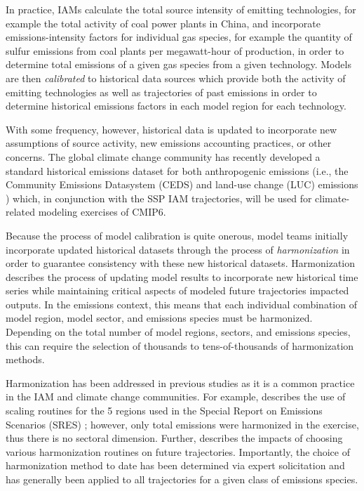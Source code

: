 In practice, IAMs calculate the total source intensity of emitting technologies,
for example the total activity of coal power plants in China, and incorporate
emissions-intensity factors for individual gas species, for example the quantity
of sulfur emissions from coal plants per megawatt-hour of production, in order
to determine total emissions of a given gas species from a given
technology. Models are then \textit{calibrated} to historical data sources which
provide both the activity of emitting technologies as well as trajectories of
past emissions in order to determine historical emissions factors in each model
region for each technology.

With some frequency, however, historical data is updated to incorporate new
assumptions of source activity, new emissions accounting practices, or other
concerns. The global climate change community has recently developed a standard
historical emissions dataset for both anthropogenic emissions (i.e., the
Community Emissions Datasystem (CEDS) \cite{hoesly_historical_2017} and
land-use change (LUC) emissions \cite{van_marle_historic_2017}) which, in
% 
% 
conjunction with the SSP IAM trajectories, will be used for climate-related
modeling exercises of CMIP6.

Because the process of model calibration is quite onerous, model teams initially
incorporate updated historical datasets through the process of
\textit{harmonization} in order to guarantee consistency with these new
historical datasets. Harmonization describes the process of updating model
results to incorporate new historical time series while maintaining critical
aspects of modeled future trajectories impacted outputs. In the emissions
context, this means that each individual combination of model region, model
sector, and emissions species must be harmonized. Depending on the total number
of model regions, sectors, and emissions species, this can require the selection
of thousands to tens-of-thousands of harmonization methods.

Harmonization has been addressed in previous studies as it is a common practice
in the IAM and climate change communities. For example,
\cite{meinshausen_rcp_2011} describes the use of scaling routines for the 5
regions used in the Special Report on Emissions Scenarios (SRES)
\cite{nakicenovic2000}; however, only total emissions were harmonized in the
exercise, thus there is no sectoral dimension. Further,
\cite{rogelj_discrepancies_2011} describes the impacts of choosing various
harmonization routines on future trajectories. Importantly, the choice of
harmonization method to date has been determined via expert solicitation and has
generally been applied to all trajectories for a given class of emissions
species.

